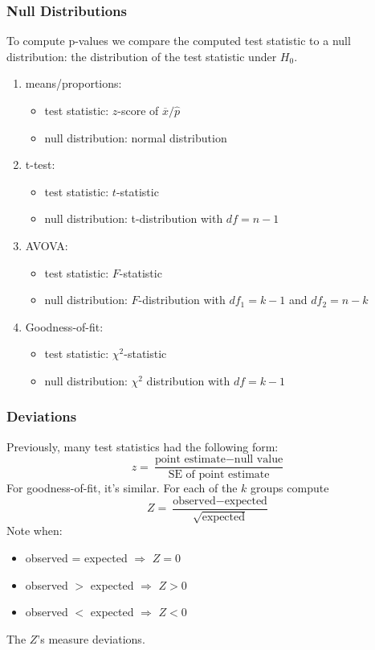 \documentclass[handout]{beamer}
\newcommand{\blue}[1]{\textcolor{blue2}{#1}}
\newcommand{\xbar}{\overline{x}}
\begin{document}
\begin{frame}[fragile]
\frametitle{Null Distributions}
To compute p-values we compare the \blue{computed test statistic} to a \blue{null distribution}:  the distribution of the test statistic under $H_0$.

\begin{enumerate}
\pause\item \blue{means/proportions}:
\begin{itemize}
\item test statistic: $z$-score of $\xbar / \widehat{p}$
\item null distribution: normal distribution
\end{itemize}
\pause\item \blue{t-test}:  
\begin{itemize}
\item test statistic: $t$-statistic
\item null distribution: t-distribution with $df=n-1$
\end{itemize}
\pause\item \blue{AVOVA}:  
\begin{itemize}
\item test statistic: $F$-statistic 
\item null distribution: $F$-distribution with $df_1=k-1$ and $df_2 = n-k$
\end{itemize}
\pause\item \blue{Goodness-of-fit}:
\begin{itemize}
\item test statistic: $\chi^2$-statistic
\item null distribution: $\chi^2$ distribution with $df=k-1$
\end{itemize}
\end{enumerate}

\end{frame}


\begin{frame}[fragile]
\frametitle{Deviations}
%
%
Previously, many test statistics had the following form:  
\[
z = \frac{\mbox{point estimate} - \mbox{null value}}{\mbox{SE of point estimate}}
\]
\pause For goodness-of-fit, it's similar.  For each of the $k$ groups compute
\[
Z = \frac{\mbox{observed} - \mbox{expected}}{\sqrt{\mbox{expected}}}
\]
\pause Note when:
\begin{itemize}
\item observed = expected $\Rightarrow$ $Z=0$
\item observed $>$ expected $\Rightarrow$ $Z>0$
\item observed $<$ expected $\Rightarrow$ $Z<0$
\end{itemize}

The $Z$'s measure deviations.
\end{frame}
\end{document}
